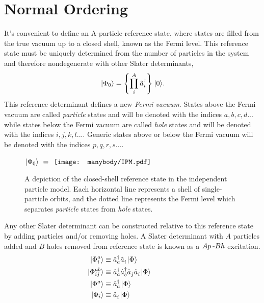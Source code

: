 \documentclass[thesis.tex]{subfiles}
\begin{document}
\section{Normal Ordering}
It's convenient to define an A-particle reference state, where states are filled from the true vacuum up to a closed shell, known as the Fermi level.  This reference state must be uniquely determined from the number of particles in the system and therefore nondegenerate with other Slater determinants,
\begin{equation}
  \hspace{1pt}\lvert \Phi_{0} \rangle = \left\{\prod_{i}^{A}\hat{a}_{i}^{\dagger}\right\}\hspace{1pt}\lvert 0 \rangle.
\end{equation}
This reference determinant defines a new \textit{Fermi vacuum}. States above the Fermi vacuum are called \textit{particle} states and will be denoted with the indices $a,b,c,d...$ while states below the Fermi vacuum are called \textit{hole} states and will be denoted with the indices $i,j,k,l...$. Generic states above or below the Fermi vacuum will be denoted with the indices $p,q,r,s...$.

\begin{figure}
  \centering
  \mbox{{\large $\hspace{1pt}\lvert \Phi_{0} \rangle\ =\ $}} $\vcenter{\hbox{\texttt{[image: manybody/IPM.pdf]}}}$
  \caption{A depiction of the closed-shell reference state in the independent particle model.  Each horizontal line represents a shell of single-particle orbits, and the dotted line represents the Fermi level which separates \textit{particle} states from \textit{hole} states.}
  \label{fig:reference_state}
\end{figure}

Any other Slater determinant can be constructed relative to this reference state by adding particles and/or removing holes.  A Slater determinant with $A$ particles added and $B$ holes removed from reference state is known as a $Ap\hspace{2pt}\text{-}Bh$ excitation.
\begin{align}
  \hspace{1pt}\lvert \Phi^{a}_{i} \rangle &\equiv \hat{a}_{a}^{\dagger}\hat{a}_{i}^{}\hspace{1pt}\lvert \Phi \rangle \hspace{2cm} \notag \\
  \hspace{1pt}\lvert \Phi^{ab}_{ij} \rangle &\equiv \hat{a}_{a}^{\dagger}\hat{a}_{b}^{\dagger}\hat{a}_{j}^{}\hat{a}_{i}^{}\hspace{1pt}\lvert \Phi \rangle \notag \\
  \hspace{1pt}\lvert \Phi^{a} \rangle &\equiv \hat{a}_{a}^{\dagger}\hspace{1pt}\lvert \Phi \rangle \notag \\
  \hspace{1pt}\lvert \Phi_{i} \rangle &\equiv \hat{a}_{i}^{}\hspace{1pt}\lvert \Phi \rangle
\end{align}
\end{document}
